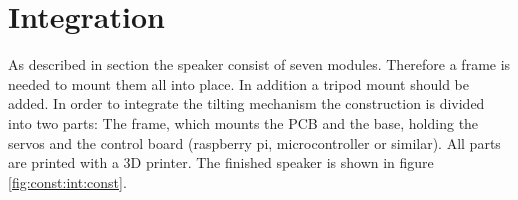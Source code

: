 \section{Integration}


As described in section  the speaker consist of seven modules. Therefore a frame is needed to mount them all into place. In addition a tripod mount should be added. In order to integrate the tilting mechanism the construction is divided into two parts: The frame, which mounts the PCB and the base, holding the servos and the control board (raspberry pi, microcontroller or similar). All parts are printed with a 3D printer. The finished speaker is shown in figure \ref{fig:const:int:const}.
%
